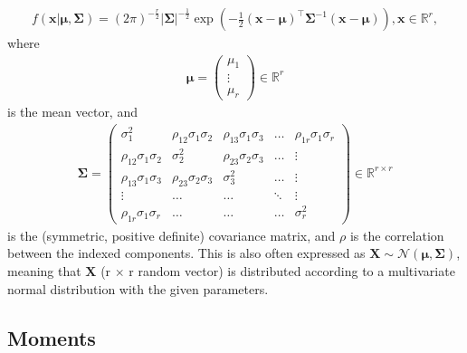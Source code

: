 \begin{definition}
    \begin{align}
        f(\bm{x}| \bm{\mu}, \bm{\Sigma})
        = (2\pi)^{-\frac{r}{2}}
        \left|\bm{\Sigma}\right|^{-\frac{1}{2}}
        \exp\left(-\frac{1}{2}(\bm{x}-\bm{\mu})^\top \bm{\Sigma}^{-1} (\bm{x}-\bm{\mu})\right),
        \bm{x} \in \mathbb{R}^r,
    \end{align}
    where
    \begin{align}
        \bm{\mu} =
        \begin{pmatrix}
            \mu_1  \\
            \vdots \\
            \mu_r
        \end{pmatrix}
        \in \mathbb{R}^r
    \end{align}
    is the mean vector, and
    \begin{align}
        \bm{\Sigma} =
        \begin{pmatrix}
            \sigma_1^2                & \rho_{12}\sigma_1\sigma_2 & \rho_{13}\sigma_1\sigma_3 & \ldots & \rho_{1r}\sigma_1\sigma_r \\
            \rho_{12}\sigma_1\sigma_2 & \sigma_2^2                & \rho_{23}\sigma_2\sigma_3 & \ldots & \vdots                    \\
            \rho_{13}\sigma_1\sigma_3 & \rho_{23}\sigma_2\sigma_3 & \sigma_3^2                & \ldots & \vdots                    \\
            \vdots                    & \ldots                    & \ldots                    & \ddots & \vdots                    \\
            \rho_{1r}\sigma_1\sigma_r & \ldots                    & \ldots                    & \ldots & \sigma_r^2
        \end{pmatrix}
        \in \mathbb{R}^{r\times r}
    \end{align}
    is the (symmetric, positive definite) covariance matrix,
    and $\rho$ is the correlation between the indexed components.
    This is also often expressed as $\bm{X} \sim \mathcal{N}(\bm{\mu}, \bm{\Sigma})$,
    meaning that $\bm{X}$ (r $\times$ r random vector) is distributed
    according to a multivariate normal distribution with the given parameters.
\end{definition}

\subsection{Moments}\label{subsec:moments}

